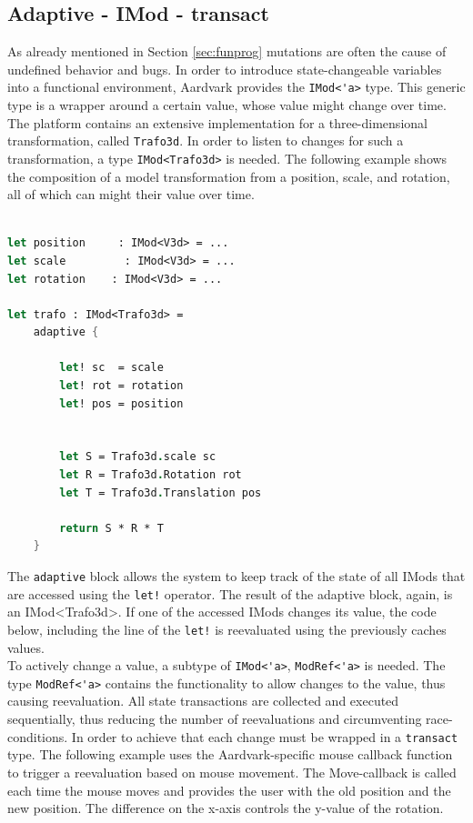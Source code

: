 \subsection{Adaptive - IMod - transact}
\label{sec:adaptive}
As already mentioned in Section \ref{sec:funprog} mutations are often the cause of undefined behavior and bugs. In order to introduce state-changeable variables into a functional environment, Aardvark provides the \verb|IMod<'a>| type. This generic type is a wrapper around a certain value, whose value might change over time. The platform contains an extensive implementation for a three-dimensional transformation, called \verb|Trafo3d|. In order to listen to changes for such a transformation, a type \verb|IMod<Trafo3d>| is needed. The following example shows the composition of a model transformation from a position, scale, and rotation, all of which can might their value over time. 

\begin{lstlisting}[language = FSharp]

let position     : IMod<V3d> = ... 
let scale         : IMod<V3d> = ... 
let rotation    : IMod<V3d> = ...

let trafo : IMod<Trafo3d> = 
    adaptive {
    
        let! sc  = scale
        let! rot = rotation
        let! pos = position
        
        
        let S = Trafo3d.scale sc
        let R = Trafo3d.Rotation rot
        let T = Trafo3d.Translation pos
        
        return S * R * T
    }
\end{lstlisting}
The \verb|adaptive| block allows the system to keep track of the state of all IMods that are accessed using the \verb|let!| operator. The result of the adaptive block, again, is an IMod<Trafo3d>. If one of the accessed IMods changes its value, the code below, including the line of the \verb|let!| is reevaluated using the previously caches values. 
\\

To actively change a value, a subtype of \verb|IMod<'a>|, \verb|ModRef<'a>| is needed. The type \verb|ModRef<'a>| contains the functionality to allow changes to the value, thus causing reevaluation. All state transactions are collected and executed sequentially, thus reducing the number of reevaluations and circumventing race-conditions. In order to achieve that each change must be wrapped in a \verb|transact| type. 
The following example uses the Aardvark-specific mouse callback function to trigger a reevaluation based on mouse movement. The Move-callback is called each time the mouse moves and provides the user with the old position and the new position. The difference on the x-axis controls the y-value of the rotation. 

